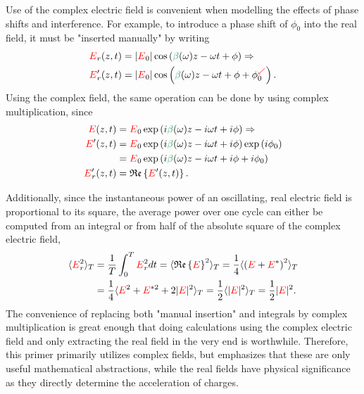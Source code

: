 Use of the complex electric field is convenient when modelling the effects of phase shifts and interference. For example, to introduce a phase shift of $\phi_0$ into the real field, it must be "inserted manually" by writing
\begin{align}
\label{eq:insert_phase}
    \E_r(z,t) &= |\E_0|\cos\left(\betag(\omega)z-\omega t+\phi\right) \Rightarrow \\ \nonumber \E_r'(z,t) &= |\E_0|\cos\left(\betag(\omega)z-\omega t+\phi+\phi_0^{\textcolor{Red}{\swarrow}}\right).   
\end{align}
Using the complex field, the same operation can be done by using complex multiplication, since
\begin{align}
\label{eq:insert_phase_complex}
    \E(z,t) &=\E_0 \exp\left( i\betag(\omega)z-i\omega t+ i\phi\right)\Rightarrow \\ \nonumber \E'(z,t) &=  \E_0 \exp\left( i\betag(\omega)z-i\omega t +i\phi\right)\exp\left( i\phi_0\right) \\ \nonumber
    &=\E_0 \exp\left( i\betag(\omega)z-i\omega t +i\phi+ i\phi_0\right) \\ \nonumber
    \E_r'(z,t) &= \real\left\{  \E'(z,t)   \right\}. 
\end{align}

Additionally, since the instantaneous power of an oscillating, real electric field is proportional to its square, the average power over one cycle can either be computed from an integral or from half of the absolute square of the complex electric field,
\begin{align}
\label{eq:average_power}
    \langle \textcolor{red}{E}_r^2 \rangle_T&= \frac{1}{T}\int_{0}^{T} \textcolor{red}{E}_r^2 dt = \langle\mathfrak{Re}\left\{\textcolor{red}{E}\right\}^2\rangle_T =\frac{1}{4}\langle\left(\textcolor{red}{E}+\textcolor{red}{E}^*\right)^2\rangle_T\\ \nonumber
&=\frac{1}{4}\langle \textcolor{red}{E}^2+\textcolor{red}{E}^{*2}+2|\textcolor{red}{E}|^2 \rangle_T=\frac{1}{2} \langle|\textcolor{red}{E}|^2\rangle_T=\frac{1}{2}|\textcolor{red}{E}|^2.
\end{align}
The convenience of replacing both "manual insertion" and integrals by complex multiplication is great enough that doing calculations using the complex electric field and only extracting the real field in the very end is worthwhile. Therefore, this primer primarily utilizes complex fields, but emphasizes that these are only useful mathematical abstractions, while the real fields have physical significance as they directly determine the acceleration of charges.  

